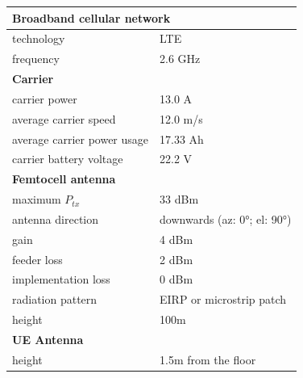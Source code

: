 \documentclass[twocolumn]{phdsymp} %
\begin{document}
\begin{table}[!htb]
\centering
\begin{tabular}[t]{ll}
        \toprule
        \multicolumn{2}{l}{\textbf{Broadband cellular network}} \\
        \hline
        \hspace{3mm}  technology        & LTE     \\
        \hspace{3mm}  frequency         & 2.6 GHz \\
        \hline
        \multicolumn{2}{l}{\textbf{Carrier}} \\
        \hline  
        \hspace{3mm}  carrier power        & 13.0 A   \\
        \hspace{3mm}  average carrier speed        & 12.0 m/s \\
        \hspace{3mm}  average carrier power usage      & 17.33 Ah    \\
        \hspace{3mm}  carrier battery voltage       & 22.2 V \\
        \hline
        \multicolumn{2}{l}{\textbf{Femtocell antenna}} \\
        \hline  
        \hspace{3mm}  maximum $P_{tx}$          & 33 dBm   \\
        \hspace{3mm}  antenna  direction        & downwards (az: \ang{0}; el: \ang{90})    \\ 
        \hspace{3mm}  gain                      & 4 dBm   \\ 
        \hspace{3mm}  feeder loss               & 2 dBm   \\ 
        \hspace{3mm}  implementation loss       & 0 dBm   \\
        \hspace{3mm}  radiation pattern         & EIRP or microstrip patch\\
        \hspace{3mm}  height                    & 100m  \\
        \hline
        \multicolumn{2}{l}{\textbf{UE Antenna}} \\
        \hline 
        \hspace{3mm} height                     & 1.5m from the floor       \\ 

\end{tabular}
\end{table}
\end{document}
